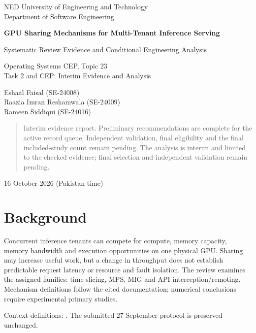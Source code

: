 \documentclass[12pt,a4paper]{article}
\begin{document}
\begin{titlepage}\centering
{\large NED University of Engineering and Technology\\Department of Software Engineering\par}\vspace{1.1cm}
{\LARGE\bfseries GPU Sharing Mechanisms for Multi-Tenant Inference Serving\par}\vspace{0.5cm}
{\Large Systematic Review Evidence and Conditional Engineering Analysis\par}\vspace{0.5cm}
{\large Operating Systems CEP, Topic 23\\Task 2 and CEP: Interim Evidence and Analysis\par}\vspace{0.8cm}
Eshaal Faisal (SE-24008)\\Raazia Imran Reshamwala (SE-24009)\\Rameen Siddiqui (SE-24016)
\vspace{1cm}\begin{quote}
Interim evidence report. Preliminary recommendations are complete for the active record queue. Independent validation, final eligibility and the final included-study count remain pending. The analysis is interim and limited to the checked evidence; final selection and independent validation remain pending.
\end{quote}\vfill 16 October 2026 (Pakistan time)
\end{titlepage}\begingroup\setlength{\parskip}{0pt}\makeatletter\renewcommand{}\makeatother\tableofcontents\endgroup\newpage

\section{Background}
Concurrent inference tenants can compete for compute, memory capacity, memory bandwidth and execution opportunities on one physical GPU. Sharing may increase useful work, but a change in throughput does not establish predictable request latency or resource and fault isolation. The review examines the assigned families: time-slicing, MPS, MIG and API interception/\allowbreak{}remoting. Mechanism definitions follow the cited documentation; numerical conclusions require experimental primary studies.


Context definitions: \cite{nvidiaMPS,nvidiaMIG,nvidiaTime}. The submitted 27 September protocol is preserved unchanged.
\end{document}
